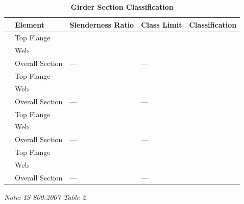 \documentclass[12pt,a4paper]{report}
\numberwithin{table}{chapter}
\numberwithin{figure}{chapter}
\begin{document}
\vspace{1em}
\begin{longtable}{|C{2.5cm}|L{3cm}|C{3.5cm}|C{2.5cm}|>{\centering\arraybackslash}p{4.0cm}|}
\caption{\textbf{Girder Section Classification}}\\
\hline
\textbf{} & \textbf{Element} & \textbf{Slenderness Ratio} & \textbf{Class Limit} & \textbf{Classification} \\[6pt]
\hline
{} & Top Flange &  &  &  \\[6pt]
 & Web &  &  &  \\[6pt]
 & Overall Section & --- & --- &  \\[6pt]
\hline
{} & Top Flange &  &  &  \\[6pt]
 & Web &  &  &  \\[6pt]
 & Overall Section & --- & --- &  \\[6pt]
\hline
{} & Top Flange &  &  &  \\[6pt]
 & Web &  &  &  \\[6pt]
 & Overall Section & --- & --- &  \\[6pt]
\hline
{} & Top Flange &  &  &  \\[6pt]
 & Web &  &  &  \\[6pt]
 & Overall Section & --- & --- &  \\[6pt]
\hline
\end{longtable}
\noindent\textit{Note: IS 800:2007 Table 2}
\end{document}
